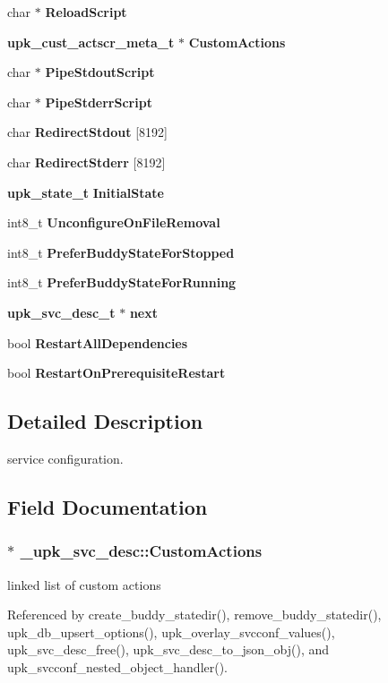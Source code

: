\begin{DoxyCompactItemize}
char $\ast$ {\bf ReloadScript}
\item 
{\bf upk\_\-cust\_\-actscr\_\-meta\_\-t} $\ast$ {\bf CustomActions}
\item 
char $\ast$ {\bf PipeStdoutScript}
\item 
char $\ast$ {\bf PipeStderrScript}
\item 
char {\bf RedirectStdout} [8192]
\item 
char {\bf RedirectStderr} [8192]
\item 
{\bf upk\_\-state\_\-t} {\bf InitialState}
\item 
int8\_\-t {\bf UnconfigureOnFileRemoval}
\item 
int8\_\-t {\bf PreferBuddyStateForStopped}
\item 
int8\_\-t {\bf PreferBuddyStateForRunning}
\item 
{\bf upk\_\-svc\_\-desc\_\-t} $\ast$ {\bf next}
\item 
bool {\bf RestartAllDependencies}
\item 
bool {\bf RestartOnPrerequisiteRestart}
\end{DoxyCompactItemize}


\subsection{Detailed Description}
service configuration. 

\subsection{Field Documentation}
\subsubsection[{CustomActions}]{ $\ast$ {\bf \_\-upk\_\-svc\_\-desc::CustomActions}}\label{struct__upk__svc__desc_a46d3e259b4edf2d7e502f30eed6d93ae}
linked list of custom actions 

Referenced by create\_\-buddy\_\-statedir(), remove\_\-buddy\_\-statedir(), upk\_\-db\_\-upsert\_\-options(), upk\_\-overlay\_\-svcconf\_\-values(), upk\_\-svc\_\-desc\_\-free(), upk\_\-svc\_\-desc\_\-to\_\-json\_\-obj(), and upk\_\-svcconf\_\-nested\_\-object\_\-handler().

